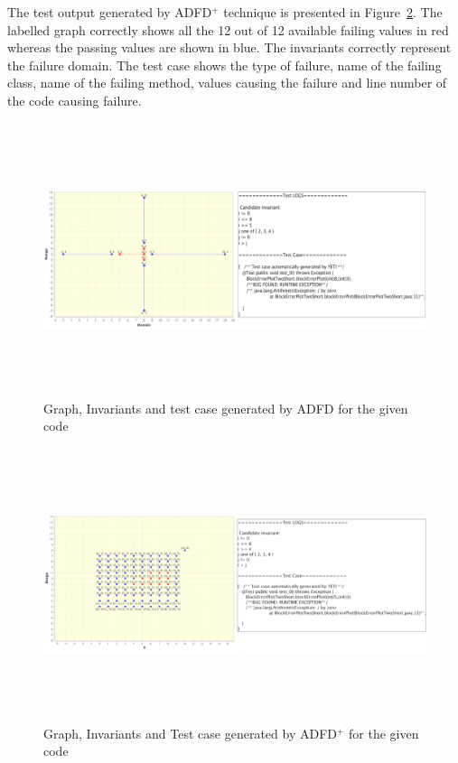 The test output generated by ADFD$^+$ technique is presented in Figure~\ref{fig:ADFD+}. The labelled graph correctly shows all the 12 out of 12 available failing values in red whereas the passing values are shown in blue. The invariants correctly represent the failure domain. The test case shows the type of failure, name of the failing class, name of the failing method, values causing the failure and line number of the code causing failure.



\begin{figure}[H]
\centering
\includegraphics[width= 15.5cm,height=8cm]{chapter7/adfdCombined.png}
\caption{Graph, Invariants and test case generated by ADFD for the given code}
\label{fig:ADFD}
\end{figure}


\bigskip
\bigskip
\begin{figure}[H]
\centering
\includegraphics[width= 15.5cm,height=8cm]{chapter7/adfdPlusCombined.png}
\caption{Graph, Invariants and Test case generated by ADFD$^+$ for the given code}
\label{fig:ADFD+}
\end{figure}
\bigskip



